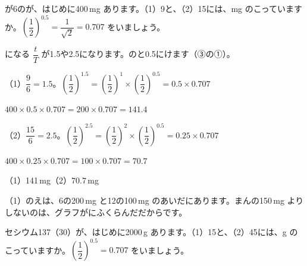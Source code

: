 \begin{reidai}
が6のが、はじめに400\,mg あります。（1）9と、（2）15には、mg のこっていますか。$\left(\dfrac{1}{2}\right)^{0.5}=\dfrac{1}{\sqrt{2}}=0.707$ をいましょう。\par
\kangaekata {}になる $\dfrac{t}{T}$ が1.5や2.5になります。のと0.5にけます（③の①）。\par
\shiki（1）\nobreak $\dfrac{9}{6}=1.5$。$\left(\dfrac{1}{2}\right)^{1.5}=\left(\dfrac{1}{2}\right)^1\times\left(\dfrac{1}{2}\right)^{0.5}=0.5\times0.707$\par
\hspace*{2.6\zw}$400\times0.5\times0.707=200\times0.707=141.4$\par
\hspace*{2.6\zw}（2）\nobreak $\dfrac{15}{6}=2.5$。$\left(\dfrac{1}{2}\right)^{2.5}=\left(\dfrac{1}{2}\right)^2\times\left(\dfrac{1}{2}\right)^{0.5}=0.25\times0.707$\par
\hspace*{2.6\zw}$400\times0.25\times0.707=100\times0.707=70.7$\par
\kotae（1）\nobreak {}141\,mg\quad（2）\nobreak {}70.7\,mg
\end{reidai}
\noindent（1）のえは、6の200\,mg と12の100\,mg のあいだにあります。まんの150\,mg よりしないのは、グラフがにふくらんだだからです。

\begin{jibun}
セシウム137（30）が、はじめに2000\,g あります。（1）15と、（2）45には、g のこっていますか。$\left(\dfrac{1}{2}\right)^{0.5}=0.707$ をいましょう。
\end{jibun}

